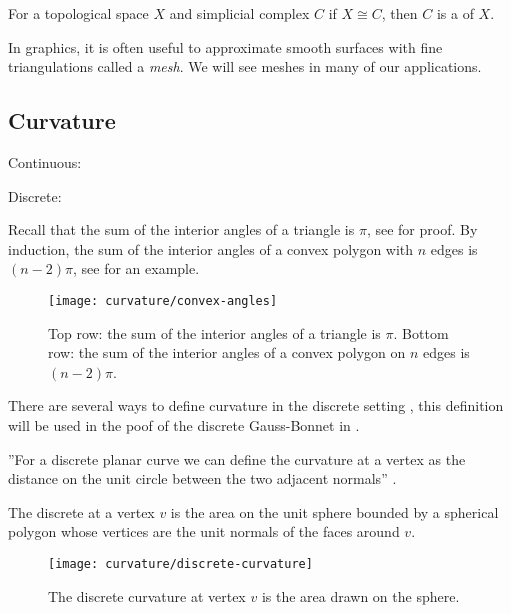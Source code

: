 \begin{definition}[Triangulation]
For a topological space $X$ and simplicial complex $C$ if $X\cong C$,
then $C$  is a  of $X$.
\end{definition}

In graphics, it is often useful to approximate smooth surfaces with fine triangulations called
a \emph{mesh}. We will see meshes in many of our applications.

\subsection{Curvature}
Continuous:

Discrete:

Recall that the sum of the interior angles of a triangle is $\pi$,
see  for proof. By induction, the sum of the interior angles
of a convex polygon with $n$ edges is  $(n-2)\pi$, see 
for an example.

\begin{figure}[htb]
\centering
\texttt{[image: curvature/convex-angles]}
\caption{Top row: the sum of  the interior angles of a triangle is $\pi$.
Bottom row: the sum of the interior angles of a convex polygon on $n$ edges is $(n-2)\pi$.}
\label{fig:angles}
\end{figure}


There are several ways to define curvature in the discrete setting \cite{Crane:2013},
this definition will be used in the poof of the discrete Gauss-Bonnet in .

''For a discrete planar curve we can define the curvature at a vertex as the distance on the unit circle between the two adjacent normals'' \cite{Crane:2013}.

\begin{definition}\label{def:discrete-curvature-vertex}

The discrete  at a vertex $v$ is the area on the unit sphere bounded by a spherical polygon whose vertices are the unit normals of the faces around $v$.

\end{definition}


\begin{figure}[htb]
\centering
\texttt{[image: curvature/discrete-curvature]}
\caption{The discrete curvature at vertex $v$ is the area drawn on the sphere.}
\label{fig:discrete-curvature}
\end{figure}

